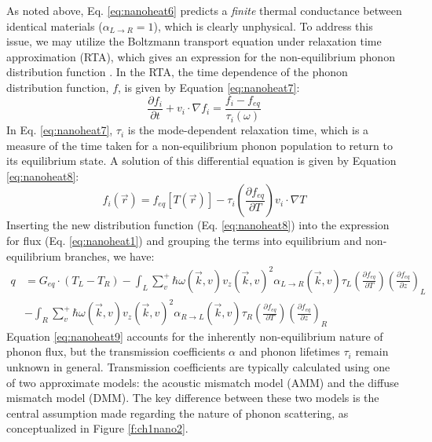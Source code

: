 As noted above, Eq. \ref{eq:nanoheat6} predicts a \emph{finite} thermal conductance between identical materials ($\alpha_{L \rightarrow R} = 1$), which is clearly unphysical. To address this issue, we may utilize the Boltzmann transport equation under relaxation time approximation (RTA), which gives an expression for the non-equilibrium phonon distribution function \cite{ziman1960electrons}.  In the RTA, the time dependence of the phonon distribution function, $f$, is given by Equation \ref{eq:nanoheat7}:
\begin{equation}\label{eq:nanoheat7}
\frac{\partial f_i}{\partial t} + v_i \cdot \nabla f_i = \frac{f_i - f_{eq}}{\tau_i\left(\omega\right)}
\end{equation}
In Eq. \ref{eq:nanoheat7}, $\tau_i$ is the mode-dependent relaxation time, which is a measure of the time taken for a non-equilibrium phonon population to return to its equilibrium state. A solution of this differential equation is given by Equation \ref{eq:nanoheat8}:
\begin{equation}\label{eq:nanoheat8}
f_i\left(\vec{r}\right) = f_{eq}\left[T(\vec{r})\right] - \tau_i\left(\frac{\partial f_{eq}}{\partial T}\right)v_i \cdot \nabla T
\end{equation}
Inserting the new distribution function (Eq. \ref{eq:nanoheat8}) into the expression for flux (Eq. \ref{eq:nanoheat1}) and grouping the terms into equilibrium and non-equilibrium branches, we have:
\begin{equation}\label{eq:nanoheat9}
\begin{split}
q &= G_{eq} \cdot (T_L - T_R) - \int_L\sum_{v}^{+}\hbar\omega(\vec{k},v)v_z(\vec{k},v)^2\alpha_{L\rightarrow R}(\vec{k},v)\tau_L\left(\frac{\partial f_{eq}}{\partial T}\right)\left(\frac{\partial f_{eq}}{\partial z}\right)_L \\
&- \int_R\sum_{v}^{+}\hbar\omega(\vec{k},v)v_z(\vec{k},v)^2\alpha_{R\rightarrow L}(\vec{k},v)\tau_R\left(\frac{\partial f_{eq}}{\partial T}\right)\left(\frac{\partial f_{eq}}{\partial z}\right)_R
\end{split}
\end{equation}
Equation \ref{eq:nanoheat9} accounts for the inherently non-equilibrium nature of phonon flux, but the transmission coefficients $\alpha$ and phonon lifetimes $\tau_i$ remain unknown in general. Transmission coefficients are typically calculated using one of two approximate models: the acoustic mismatch model (AMM) and the diffuse mismatch model (DMM). The key difference between these two models is the central assumption made regarding the nature of phonon scattering, as conceptualized in Figure \ref{f:ch1nano2}. 

